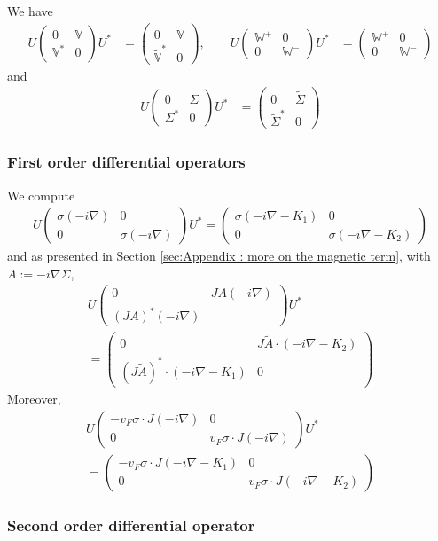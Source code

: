 \documentclass[11pt,a4paper,reqno,french,tikz]{amsart}
\newcommand{\pa}[1]{\left( #1 \right)} %
\newcommand{\na}{\nabla} %
\newcommand{\mat}[1]{\begin{pmatrix} #1 \end{pmatrix}} %
\newcommand{\bbV}{\mathbb{V}}
\def\bbV{{\mathbb V}}
\def\bbW{{\mathbb W}}
\begin{document}
We have
\begin{align*}
U \mat{0 & \bbV \\ \bbV^* & 0} U^* &= \mat{0 & \widetilde{\bbV} \\ \widetilde{\bbV}^* & 0},\qquad U \mat{\bbW^+ & 0 \\ 0 & \bbW^-} U^* &= \mat{\bbW^+ & 0 \\ 0 & \bbW^-}
\end{align*}
and
\begin{align*}
U \mat{0 & \Sigma \\ \Sigma^* & 0} U^* &= \mat{0 & \widetilde{\Sigma} \\ \widetilde{\Sigma}^* & 0}
\end{align*}

\subsubsection{First order differential operators}%
\label{ssub:First order differential operators}

We compute
\begin{align*}
	U \mat{\sigma \pa{-i\na} & 0 \\ 0 & \sigma \pa{-i\na}} U^* = \mat{\sigma \pa{-i\na -  K_1} & 0 \\ 0 & \sigma \pa{-i\na- K_2}} 
\end{align*}
and as presented in Section \ref{sec:Appendix : more on the magnetic term}, with $A := -i\na\Sigma$,
\begin{multline*}
	U \mat{0 & JA (-i\na) \\ \pa{JA}^* (-i\na)} U^* \\
=	\mat{0 & J \widetilde{A} \cdot(-i\na - K_2) \\  \pa{J\widetilde{A}}^* \cdot(-i\na -  K_1) & 0}
\end{multline*}
Moreover,
\begin{multline*}
U  \mat{- v_F \sigma\cdot J(-i\na) & 0 \\ 0 & v_F \sigma\cdot J(-i\na)} U^*  \\
=  \mat{- v_F \sigma\cdot J(-i\na -  K_1) & 0 \\ 0 & v_F \sigma\cdot J(-i\na - K_2)}
\end{multline*}


\subsubsection{Second order differential operator}
\end{document}
